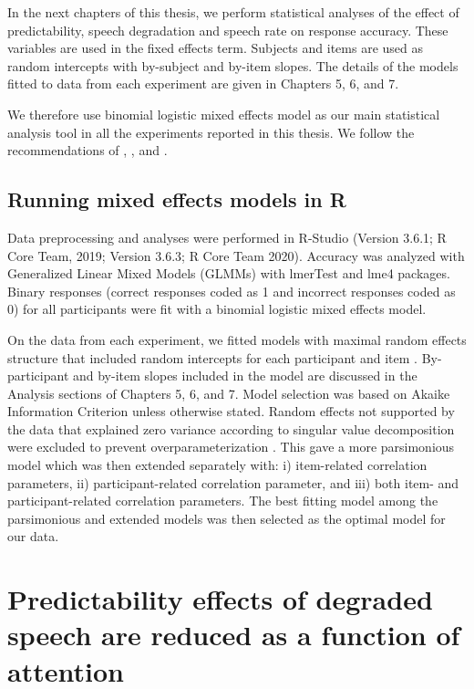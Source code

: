 \documentclass[a4paper, nobind]{templates/ociamthesis}
\begin{document}
In the next chapters of this thesis, we perform statistical analyses of the effect of predictability, speech degradation and speech rate on response accuracy.
These variables are used in the fixed effects term.
Subjects and items are used as random intercepts with by-subject and by-item slopes.
The details of the models fitted to data from each experiment are given in Chapters 5, 6, and 7.

We therefore use binomial logistic mixed effects model as our main statistical analysis tool in all the experiments reported in this thesis.
We follow the recommendations of \textcite{Baayen2008}, \textcite{Barr2013}, and \textcite{Bates2015a}.

\hypertarget{analysis-main}{%
\section{Running mixed effects models in R}\label{analysis-main}}

Data preprocessing and analyses were performed in R-Studio (Version 3.6.1; R Core Team, 2019; Version 3.6.3; R Core Team 2020).
Accuracy was analyzed with Generalized Linear Mixed Models (GLMMs) with lmerTest \autocite{Kuznetsova2017} and lme4 \autocite{Bates2015} packages.
Binary responses (correct responses coded as 1 and incorrect responses coded as 0) for all participants were fit with a binomial logistic mixed effects model.

On the data from each experiment, we fitted models with maximal random effects structure that included random intercepts for each participant and item \autocite{Barr2013}.
By-participant and by-item slopes included in the model are discussed in the Analysis sections of Chapters 5, 6, and 7.
Model selection was based on Akaike Information Criterion \autocite{Grueber2011,Richards2011} unless otherwise stated.
Random effects not supported by the data that explained zero variance according to singular value decomposition were excluded to prevent overparameterization \autocite{Bates2015a}.
This gave a more parsimonious model which was then extended separately with: i) item-related correlation parameters, ii) participant-related correlation parameter, and iii) both item- and participant-related correlation parameters.
The best fitting model among the parsimonious and extended models was then selected as the optimal model for our data.

\hypertarget{predictability-effects-of-degraded-speech-are-reduced-as-a-function-of-attention}{%
\chapter{Predictability effects of degraded speech are reduced as a function of attention}\label{predictability-effects-of-degraded-speech-are-reduced-as-a-function-of-attention}}
\end{document}
